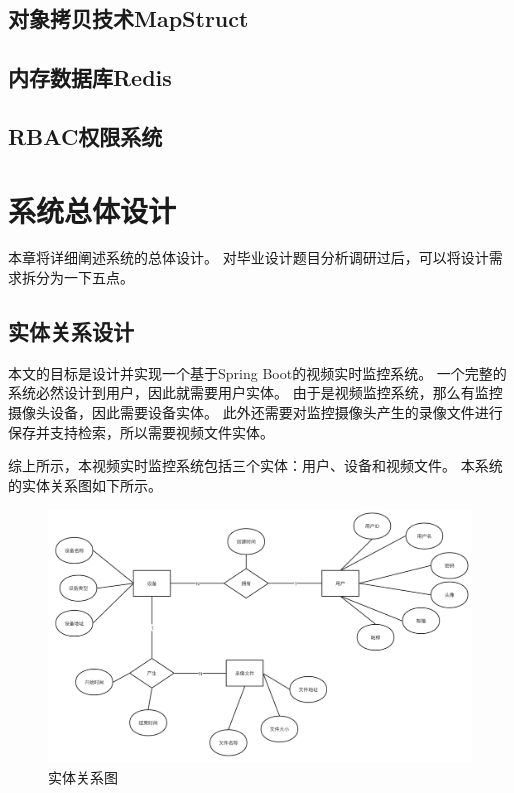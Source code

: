 \section{对象拷贝技术MapStruct}

\section{内存数据库Redis}

\section{RBAC权限系统}


\chapter{系统总体设计}
本章将详细阐述系统的总体设计。
对毕业设计题目分析调研过后，可以将设计需求拆分为一下五点。


\section{实体关系设计}
本文的目标是设计并实现一个基于Spring Boot的视频实时监控系统。
一个完整的系统必然设计到用户，因此就需要用户实体。
由于是视频监控系统，那么有监控摄像头设备，因此需要设备实体。
此外还需要对监控摄像头产生的录像文件进行保存并支持检索，所以需要视频文件实体。

综上所示，本视频实时监控系统包括三个实体：用户、设备和视频文件。
本系统的实体关系图如下所示。

\begin{figure}[ht]
    \centering
    \includegraphics[scale=.3]{./Figure/IMG_erd.png}
    \caption{实体关系图}\label{Fig:erd}
\end{figure}

